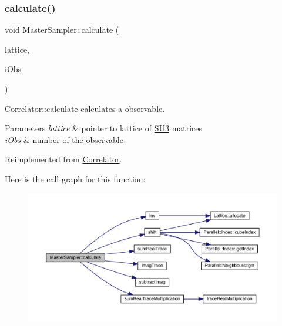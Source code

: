 \subsubsection{\texorpdfstring{calculate()}{calculate()}}
{\footnotesize\ttfamily void Master\+Sampler\+::calculate (\begin{DoxyParamCaption}\item[{\mbox{\hyperlink{class_lattice}{Lattice}}$<$ \mbox{\hyperlink{class_s_u3}{S\+U3}} $>$ $\ast$}]{lattice,  }\item[{unsigned int}]{i\+Obs }\end{DoxyParamCaption})\hspace{0.3cm}{\ttfamily [virtual]}}



\mbox{\hyperlink{class_correlator_ab33502ff305f891c5c2e6d66a26a0247}{Correlator\+::calculate}} calculates a observable. 


\begin{DoxyParams}{Parameters}
{\em lattice} & pointer to lattice of \mbox{\hyperlink{class_s_u3}{S\+U3}} matrices \\
\hline
{\em i\+Obs} & number of the observable \\
\hline
\end{DoxyParams}


Reimplemented from \mbox{\hyperlink{class_correlator_ab33502ff305f891c5c2e6d66a26a0247}{Correlator}}.

Here is the call graph for this function\+:\nopagebreak
\begin{figure}[H]
\begin{center}
\leavevmode
\includegraphics[width=350pt]{class_master_sampler_ad3cc7e36498dbf4a39238de3ac59ae8b_cgraph}
\end{center}
\end{figure}
\mbox{\label{class_master_sampler_a893be9ba7dca98cb8d9d3cb30e42fcc3}} 
